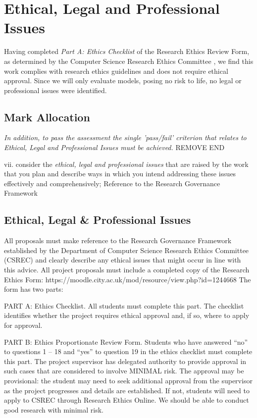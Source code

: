 \section{Ethical, Legal and Professional Issues}

Having completed \textit{Part A: Ethics Checklist} of the Research Ethics Review Form, as determined by the Computer Science Research Ethics Committee \cite{CSREC:2020}, we find this work complies with research ethics guidelines and does not require ethical approval. Since we will only evaluate models, posing no risk to life, no legal or professional issues were identified.

\subsection{Mark Allocation}

\textit{In addition, to pass the assessment the single 'pass/fail' criterion that relates to Ethical, Legal and Professional Issues must be achieved.}
REMOVE END

vii. consider the \textit{ethical, legal and professional issues} that are raised by the work that you plan and describe ways in which you intend addressing these issues effectively and comprehensively; 
Reference to the Research Governance Framework \parencite{CSREC:2020}

\subsection{Ethical, Legal \& Professional Issues}

All proposals must make reference to the Research Governance Framework established by the Department of Computer Science Research Ethics Committee (CSREC) and clearly describe any ethical issues that might occur in line with this advice.
All project proposals must include a completed copy of the Research Ethics Form:   https://moodle.city.ac.uk/mod/resource/view.php?id=1244668 
The form has two parts:

PART A: Ethics Checklist. All students must complete this part.  The checklist identifies whether the project requires ethical approval and, if so, where to apply for approval.


PART B: Ethics Proportionate Review Form. Students who have answered “no” to questions 1 – 18 and “yes” to question 19 in the ethics checklist must complete this part. The project supervisor has delegated authority to provide approval in such cases that are considered to involve MINIMAL risk. 
The approval may be provisional: the student may need to seek additional approval from the supervisor as the project progresses and details are established. If not, students will need to apply to CSREC through Research Ethics Online.  We should be able to conduct good research with minimal risk.
                       
